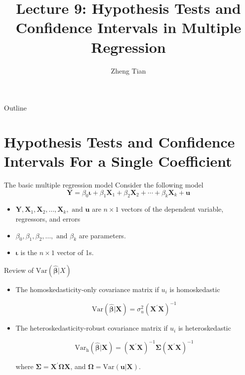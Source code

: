 \documentclass[presentation,10pt]{beamer}
\author{Zheng Tian}
\date{}
\title{Lecture 9: Hypothesis Tests and Confidence Intervals in Multiple Regression}
\newcommand{\var}{\mathrm{Var}}
\begin{document}
\maketitle
\begin{frame}{Outline}
\setcounter{tocdepth}{1}
\tableofcontents
\end{frame}



\section{Hypothesis Tests and Confidence Intervals For a Single Coefficient}
\label{sec:orgaf389e5}
\setcounter{tocdepth}{1}
\tableofcontents[currentsection]
\begin{frame}[label={sec:org4fdbb0f}]{The basic multiple regression model}
Consider the following model
\begin{equation}
\label{eq:jnt-hyp-mod}
\mathbf{Y} = \beta_0 \boldsymbol{\iota} + \beta_1 \mathbf{X}_1 + \beta_2 \mathbf{X}_2 + \cdots + \beta_k \mathbf{X}_k + \mathbf{u}
\end{equation}
\begin{itemize}
\item \(\mathbf{Y}, \mathbf{X}_1, \mathbf{X}_2, \ldots, \mathbf{X}_k, \text{ and } \mathbf{u}\) are \(n
  \times 1\) vectors of the dependent variable, regressors, and
errors
\item \(\beta_0, \beta_1, \beta_2, \ldots, \text{ and } \beta_k\) are
parameters.
\item \(\boldsymbol{\iota}\) is the \(n \times 1\) vector of 1s.
\end{itemize}
\end{frame}

\begin{frame}[label={sec:org058f89f}]{Review of \(\var(\hat{\boldsymbol{\beta}}|X)\)}
\begin{itemize}
\item The homoskedasticity-only covariance matrix if \(u_i\) is
homoskedastic

\begin{equation}
\label{eq:varbhat-hm-1}
\var(\hat{\boldsymbol{\beta}} | \mathbf{X}) = \sigma^2_u (\mathbf{X}^{\prime} \mathbf{X})^{-1}
\end{equation}

\item The heteroskedasticity-robust covariance matrix if \(u_i\) is
heteroskedastic

\begin{equation}
\label{eq:varbhat-ht-1}
\var_{\mathrm{h}}(\hat{\boldsymbol{\beta}} | \mathbf{X}) = \left(\mathbf{X}^{\prime} \mathbf{X}\right)^{-1} \boldsymbol{\Sigma} (\mathbf{X}^{\prime} \mathbf{X})^{-1}
\end{equation}

where \(\boldsymbol{\Sigma} = \mathbf{X}^{\prime} \boldsymbol{\Omega}
  \mathbf{X}\), and \(\boldsymbol{\Omega} = \var(\mathbf{u} |
  \mathbf{X})\).
\end{itemize}
\end{frame}
\end{document}
